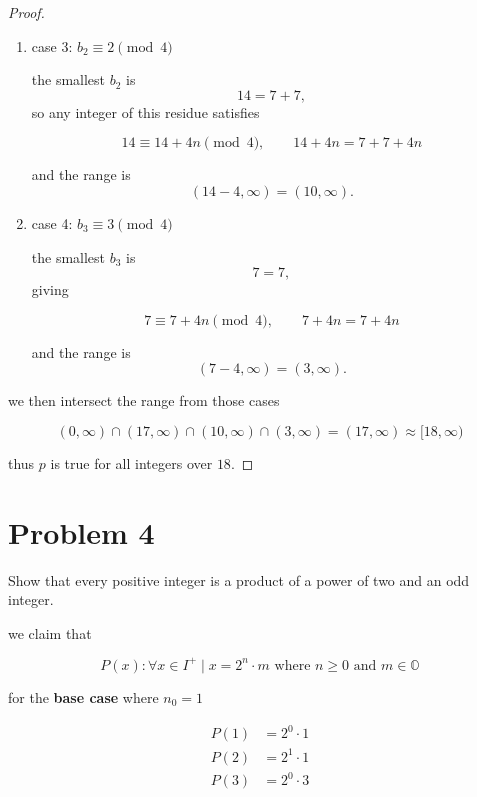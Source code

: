 \begin{proof}
\begin{enumerate}
and the range is
\[
(21 - 4, \infty) = (17, \infty).
\]

\item case 3: $b_2 \equiv 2 \pmod 4$

\vspace{1em}

the smallest $b_2$ is
\[
14 = 7 + 7,
\]
so any integer of this residue satisfies

\[
14 \equiv 14 + 4n \pmod 4, \qquad 14 + 4n = 7 + 7 + 4n
\]

and the range is
\[
(14 - 4, \infty) = (10, \infty).
\]

\item case 4: $b_3 \equiv 3 \pmod 4$

\vspace{1em}

the smallest $b_3$ is
\[
7 = 7,
\]
giving

\[
7 \equiv 7 + 4n \pmod 4, \qquad 7 + 4n = 7 + 4n
\]

and the range is
\[
(7 - 4, \infty) = (3, \infty).
\]
\end{enumerate}

we then intersect the range from those cases

\[
(0, \infty) \cap (17, \infty) \cap (10, \infty) \cap (3, \infty) = (17,
\infty) \approx [18, \infty)
\]

thus $p$ is true for all integers over $18$.\vspace{1em}

\end{proof}

\vspace{1em}
\hrulefill

\section*{Problem 4}
Show that every positive integer is a product of a power of two and an odd integer.

\medskip
\solution

we claim that

\[
P(x) : \forall x \in I^+ \mid x = 2^n \cdot m \text{ where } n \ge 0
\text{ and } m \in \mathbb{O}
\]

for the \textbf{base case} where $n_0 = 1$

\[
\begin{aligned}
P(1) &= 2^0 \cdot 1 \\
P(2) &= 2^1 \cdot 1 \\
P(3) &= 2^0 \cdot 3
\end{aligned}
\]

